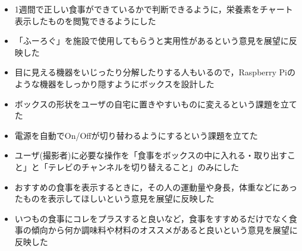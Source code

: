 \documentclass[../report]{subfiles}
\begin{document}
\begin{itemize}
    \item 1週間で正しい食事ができているかで判断できるように，栄養素をチャート表示したものを閲覧できるようにした
    \item 「ふーろぐ」を施設で使用してもらうと実用性があるという意見を展望に反映した
    \item 目に見える機器をいじったり分解したりする人もいるので，Raspberry Piのような機器をしっかり隠すようにボックスを設計した
    \item ボックスの形状をユーザの自宅に置きやすいものに変えるという課題を立てた
    \item 電源を自動でOn/Offが切り替わるようにするという課題を立てた
    \item ユーザ(撮影者)に必要な操作を「食事をボックスの中に入れる・取り出すこと」と「テレビのチャンネルを切り替えること」のみにした
    \item おすすめの食事を表示するときに，その人の運動量や身長，体重などにあったものを表示してほしいという意見を展望に反映した
    \item いつもの食事にコレをプラスすると良いなど，食事をすすめるだけでなく食事の傾向から何か調味料や材料のオススメがあると良いという意見を展望に反映した
\end{itemize}
\end{document}
